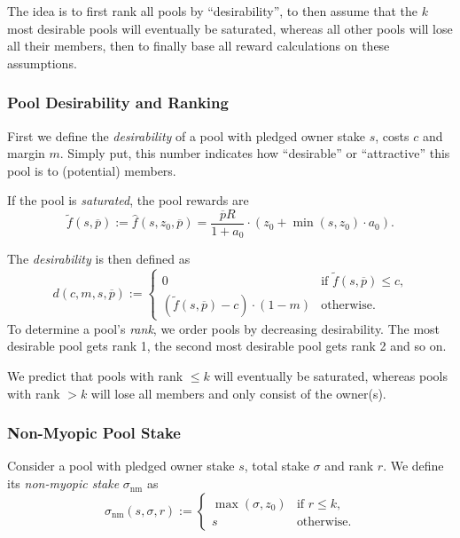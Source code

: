\documentclass[11pt,a4paper,dvipsnames,twosided]{article}
\newcommand\pbar{\overline{p}}
\begin{document}
The idea is to first rank all pools by ``desirability'', to then assume
that the \(k\) most desirable pools will eventually be saturated,
whereas all other pools will lose all their members, then to finally
base all reward calculations on these assumptions.

\subsubsection{Pool Desirability and Ranking}
\label{pool-desirability-and-ranking}

First we define the \emph{desirability} of a pool with pledged owner stake
\(s\), costs \(c\) and margin \(m\). Simply put, this number indicates how
``desirable'' or ``attractive'' this pool is to (potential) members.

If the pool is \emph{saturated}, the pool rewards are \[
    \tilde{f}(s, \pbar) :=
    \hat{f}(s,z_0,\pbar)=
    \frac{\pbar R}{1 + a_0}
    \cdot
    \left(z_0 + \min(s,z_0)\cdot a_0\right).
\]

The \emph{desirability} is then defined as \[
    d(c, m, s, \pbar) :=
    \left\{
    \begin{array}{ll}
        \displaystyle 0 &
        \text{if $\tilde{f}(s,\pbar)\leq c$,} \\
        \displaystyle\left(\tilde{f}(s,\pbar) - c\right)\cdot(1-m) &
        \text{otherwise.}
    \end{array}
    \right.
\] To determine a pool's \emph{rank}, we order pools by decreasing
desirability. The most desirable pool gets rank 1, the second most
desirable pool gets rank 2 and so on.

We predict that pools with rank \(\leq k\) will eventually be saturated,
whereas pools with rank \(>k\) will lose all members and only consist of
the owner(s).

\subsubsection{Non-Myopic Pool Stake}
\label{non-myopic-pool-stake}

Consider a pool with pledged owner stake \(s\), total stake \(\sigma\) and rank
\(r\). We define its \emph{non-myopic stake} \(\sigma_\mathrm{nm}\) as
\[
    \sigma_\mathrm{nm}(s,\sigma,r) :=
    \left\{
    \begin{array}{ll}
        \max(\sigma,z_0) &
        \text{if $r\leq k$,} \\
        s &
        \text{otherwise.}
    \end{array}
    \right.
\]
\end{document}
